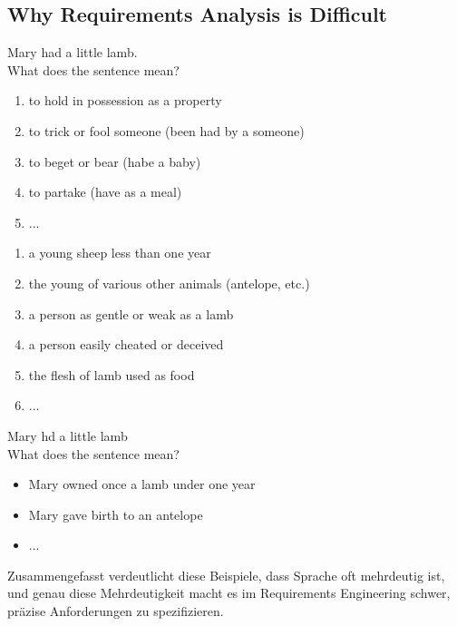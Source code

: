 \subsection{Why Requirements Analysis is Difficult}
Mary had a little lamb.\\
What does the sentence mean?
\begin{defBox}[title=Meanings of to have]
	\begin{enumerate}
		\item to hold in possession as a property
		\item to trick or fool someone (been had by a someone)
		\item to beget or bear (habe a baby)
		\item to partake (have as a meal)
		\item ...
	\end{enumerate}
\end{defBox}
\begin{defBox}[title=Meanings of lamb]
	\begin{enumerate}
		\item a young sheep less than one year
		\item the young of various other animals (antelope, etc.)
		\item a person as gentle or weak as a lamb
		\item a person easily cheated or deceived
		\item the flesh of lamb used as food
		\item ...
	\end{enumerate}
\end{defBox}
Mary hd a little lamb\\
What does the sentence mean?
\begin{itemize}
	\item Mary owned once a lamb under one year
	\item Mary gave birth to an antelope
	\item ...
\end{itemize}
\begin{infoBox}
    Zusammengefasst verdeutlicht diese Beispiele, dass Sprache oft mehrdeutig ist, und genau diese Mehrdeutigkeit macht es im Requirements Engineering schwer, präzise Anforderungen zu spezifizieren.
\end{infoBox}

